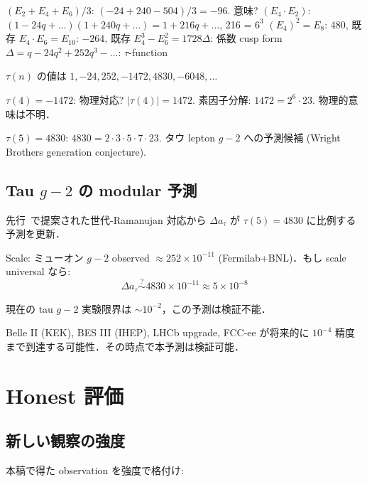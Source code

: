 \documentclass[11pt,a4paper]{article}
\begin{document}
$(E_2 + E_4 + E_6)/3$: $(-24 + 240 - 504)/3 = -96$. 意味?
$(E_4 \cdot E_2)$: $(1 - 24q + \ldots)(1 + 240q + \ldots) = 1 + 216 q + \ldots$, 216 = $6^3$
$(E_4)^2 = E_8$: 480, 既存
$E_4 \cdot E_6 = E_{10}$: $-264$, 既存
$E_4^3 - E_6^2 = 1728 \Delta$: 係数 cusp form
$\Delta = q - 24 q^2 + 252 q^3 - \ldots$: $\tau$-function

$\tau(n)$ の値は $1, -24, 252, -1472, 4830, -6048, \ldots$

$\tau(4) = -1472$: 物理対応?
$|\tau(4)| = 1472$. 素因子分解: $1472 = 2^6 \cdot 23$. 物理的意味は不明．

$\tau(5) = 4830$: $4830 = 2 \cdot 3 \cdot 5 \cdot 7 \cdot 23$.
タウ lepton $g-2$ への予測候補 (Wright Brothers generation conjecture).

\subsection{Tau $g-2$ の modular 予測}

先行~\cite{wb-spec-z}で提案された世代-Ramanujan 対応から
$\Delta a_\tau$ が $\tau(5) = 4830$ に比例する予測を更新．

Scale: ミューオン $g-2$ observed $\approx 252 \times 10^{-11}$
(Fermilab+BNL)．もし scale universal なら:
\begin{equation}
\Delta a_\tau \stackrel{?}{\sim} 4830 \times 10^{-11} \approx 5 \times 10^{-8}
\end{equation}

現在の tau $g-2$ 実験限界は $\sim 10^{-2}$，この予測は検証不能．

Belle II (KEK), BES III (IHEP), LHCb upgrade, FCC-ee が将来的に
$10^{-4}$ 精度まで到達する可能性．その時点で本予測は検証可能．

\section{Honest 評価}

\subsection{新しい観察の強度}

本稿で得た observation を強度で格付け:
\end{document}
